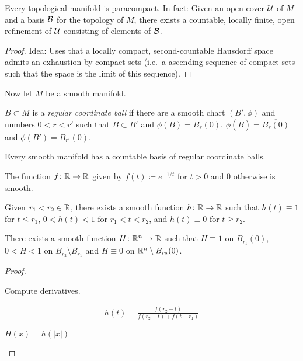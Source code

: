 \documentclass{skript}
\begin{document}
\begin{thm}
    Every topological manifold is paracompact.
    In fact: Given an open cover $\mathcal{U}$ of $M$ and a basis $\mathcal{B}$ for the topology of $M$, there exists a countable, locally finite, open refinement of $\mathcal{U}$ consisting of elements of $\mathcal{B}$.
\end{thm}
\begin{proof}
    Idea: Uses that a locally compact, second-countable Hausdorff space admits an exhaustion by compact sets (i.e.\ a ascending sequence of compact sets such that the space is the limit of this sequence).
\end{proof}
Now let $M$ be a smooth manifold.
\begin{definition}
    $B\subset M$ is a \emph{regular coordinate ball} if there are a smooth chart $(B',\phi)$ and numbers $0<r<r'$ such that $B\subset B'$ and $\phi(B) = B_r(0)$, $\phi(\overline B) = \overline{B_r(0)}$ and $\phi(B') = B_{r'}(0)$.
\end{definition}

\begin{prop}
    Every smooth manifold has a countable basis of regular coordinate balls.
\end{prop}

\begin{lemma}
    \begin{alphanumerate}
    \item
        The function $f\colon \mathbb{R}\to \mathbb{R}$ given by $f(t)\coloneqq e^{-1/t}$ for $t>0$ and $0$ otherwise is smooth.
    \item
        Given $r_1<r_2\in \mathbb{R}$, there exists a smooth function $h\colon \mathbb{R}\to \mathbb{R}$ such that $h(t) \equiv 1$ for $t\leq r_1$, $0<h(t)<1$ for $r_1<t<r_2$, and $h(t) \equiv 0$ for $t\geq r_2$.
    \item
        There exists a smooth function $H\colon \mathbb{R}^n\to\mathbb{R}$ such that $H\equiv 1$ on $\overline{B_{r_1}(0)}$, $0 < H < 1$ on $B_{r_2}\setminus \overline{B_{r_1}}$ and $H\equiv 0$ on $\mathbb{R}^n \setminus B_{r_2}(0)$.
    \end{alphanumerate}
\end{lemma}

\begin{proof}
    \begin{alphanumerate}
    \item
        Compute derivatives.
    \item
        \begin{align*}
            h(t) = \frac{f(r_2-t)}{f(r_2-t) + f(t-r_1)}
        \end{align*}
    \item
        $H(x) = h(|x|)$
        
    \end{alphanumerate}
    
\end{proof}
\end{document}
